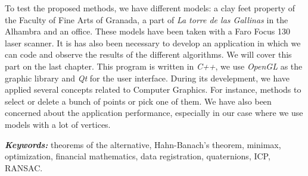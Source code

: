 To test the proposed methods, we have different models: a clay feet property of the Faculty of Fine Arts of Granada, a part of \textit{La torre de las Gallinas} in the Alhambra and an office. These models have been taken with a Faro Focus 130 laser scanner. It is has also been necessary to develop an application in which we can code and observe the results of the different algorithms. We will cover this part on the last chapter. This program is written in \textit{C++}, we use \textit{OpenGL} as the graphic library and \textit{Qt} for the user interface. During its develepment, we have applied several concepts related to Computer Graphics. For instance, methods to select or delete a bunch of points or pick one of them. We have also been concerned about the application performance, especially in our case where we use models with a lot of vertices.\\

\providecommand{\keywords}[1]
{
	\small	
	\textbf{\textit{Keywords: }} #1
}
\keywords{theorems of the alternative, Hahn-Banach's theorem, minimax, optimization, financial mathematics, data registration, quaternions, ICP, RANSAC.}